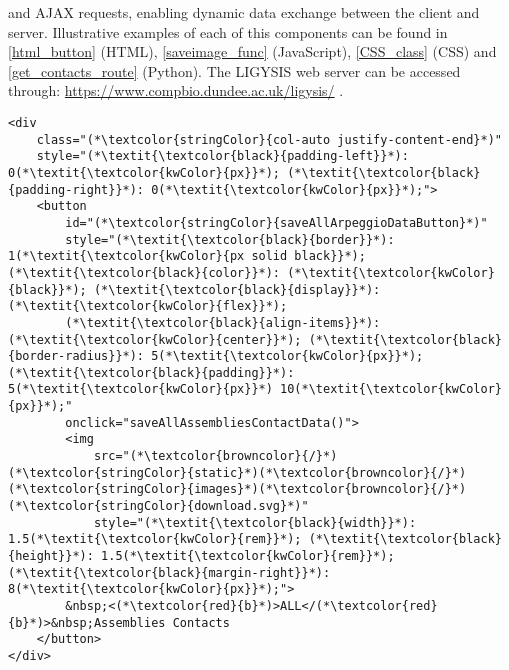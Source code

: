 \noindent
and AJAX \cite{AJAX} requests, enabling dynamic data exchange between the client and server. Illustrative examples of each of this components can be found in \autoref{html_button} (HTML), \autoref{saveimage_func} (JavaScript), \autoref{CSS_class} (CSS) and \autoref{get_contacts_route} (Python). The LIGYSIS web server can be accessed through: \url{https://www.compbio.dundee.ac.uk/ligysis/} \cite{LIGYSIS_SERVER}.


\lstset{style=mystyle}

\begin{lstlisting}[language=MyHTML, caption={[HTML \texttt{saveAllArpeggioDataButton} download button]\textbf{HTML \texttt{saveAllArpeggioDataButton} download button.} This HTML element contains a button (\texttt{saveAllArpeggioDataButton}) that downloads the pdbe-arpeggio protein-ligand contacts for all biological assemblies mapping to a protein segment. The JavaScript \texttt{saveAllAssembliesContactData} function is called upon clicking. A combination of Bootstrap classes and custom CSS is used for stylings.}, label={html_button}]
<div
	class="(*\textcolor{stringColor}{col-auto justify-content-end}*)"
	style="(*\textit{\textcolor{black}{padding-left}}*): 0(*\textit{\textcolor{kwColor}{px}}*); (*\textit{\textcolor{black}{padding-right}}*): 0(*\textit{\textcolor{kwColor}{px}}*);">
	<button
		id="(*\textcolor{stringColor}{saveAllArpeggioDataButton}*)" 
		style="(*\textit{\textcolor{black}{border}}*): 1(*\textit{\textcolor{kwColor}{px solid black}}*); (*\textit{\textcolor{black}{color}}*): (*\textit{\textcolor{kwColor}{black}}*); (*\textit{\textcolor{black}{display}}*): (*\textit{\textcolor{kwColor}{flex}}*);
		(*\textit{\textcolor{black}{align-items}}*): (*\textit{\textcolor{kwColor}{center}}*); (*\textit{\textcolor{black}{border-radius}}*): 5(*\textit{\textcolor{kwColor}{px}}*); (*\textit{\textcolor{black}{padding}}*): 5(*\textit{\textcolor{kwColor}{px}}*) 10(*\textit{\textcolor{kwColor}{px}}*);" 
		onclick="saveAllAssembliesContactData()">
		<img
			src="(*\textcolor{browncolor}{/}*)(*\textcolor{stringColor}{static}*)(*\textcolor{browncolor}{/}*)(*\textcolor{stringColor}{images}*)(*\textcolor{browncolor}{/}*)(*\textcolor{stringColor}{download.svg}*)"
			style="(*\textit{\textcolor{black}{width}}*): 1.5(*\textit{\textcolor{kwColor}{rem}}*); (*\textit{\textcolor{black}{height}}*): 1.5(*\textit{\textcolor{kwColor}{rem}}*); (*\textit{\textcolor{black}{margin-right}}*): 8(*\textit{\textcolor{kwColor}{px}}*);">
		&nbsp;<(*\textcolor{red}{b}*)>ALL</(*\textcolor{red}{b}*)>&nbsp;Assemblies Contacts
	</button>
</div>
\end{lstlisting}


